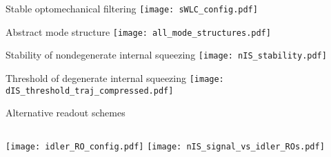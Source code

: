\documentclass[12pt,xcolor=dvipsnames]{beamer}
\begin{document}

\begin{frame}[noframenumbering]{Stable optomechanical filtering}
\centering
\texttt{[image: sWLC\_config.pdf]}
\end{frame}

\begin{frame}[noframenumbering]{Abstract mode structure}
\centering
\texttt{[image: all\_mode\_structures.pdf]}
\end{frame}

\begin{frame}[noframenumbering]{Stability of nondegenerate internal squeezing}
\centering
\texttt{[image: nIS\_stability.pdf]}
\end{frame}

\begin{frame}[noframenumbering]{Threshold of degenerate internal squeezing}
\centering
\texttt{[image: dIS\_threshold\_traj\_compressed.pdf]}
\end{frame}

\begin{frame}[noframenumbering]{Alternative readout schemes}
\begin{columns}
\texttt{[image: idler\_RO\_config.pdf]}
\centering
{}
\centering
\texttt{[image: nIS\_signal\_vs\_idler\_ROs.pdf]}
\end{columns}
\end{frame}
\end{document}
